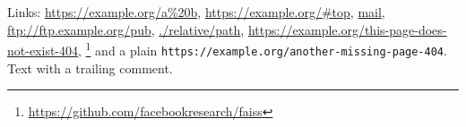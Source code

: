 \documentclass{article}
\begin{document}
Links: \url{https://example.org/a%20b}, \url{https://example.org/#top}, \href{mailto:someone@example.org}{mail},
\url{ftp://ftp.example.org/pub}, \url{./relative/path}, \url{https://example.org/this-page-does-not-exist-404},
\footnote{\url{https://github.com/facebookresearch/faiss}} and a plain \texttt{https://example.org/another-missing-page-404}.
Text with a trailing comment. %
\end{document}
